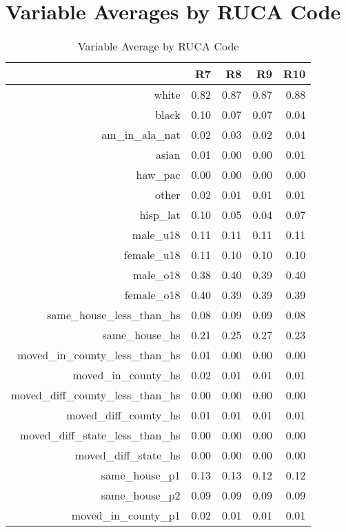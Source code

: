 \chapter{Variable Averages by RUCA Code}	%

\begin{table}[ht]
    \caption{Variable Average by RUCA Code}
    \label{tab:ruca_stats}
    \tiny
    \centering
    \begin{tabular}{rrrrr}
      \hline
     & R7 & R8 & R9 & R10 \\ 
      \hline
    white & 0.82 & 0.87 & 0.87 & 0.88 \\ 
      black & 0.10 & 0.07 & 0.07 & 0.04 \\ 
      am\_in\_ala\_nat & 0.02 & 0.03 & 0.02 & 0.04 \\ 
      asian & 0.01 & 0.00 & 0.00 & 0.01 \\ 
      haw\_pac & 0.00 & 0.00 & 0.00 & 0.00 \\ 
      other & 0.02 & 0.01 & 0.01 & 0.01 \\ 
      hisp\_lat & 0.10 & 0.05 & 0.04 & 0.07 \\ 
      male\_u18 & 0.11 & 0.11 & 0.11 & 0.11 \\ 
      female\_u18 & 0.11 & 0.10 & 0.10 & 0.10 \\ 
      male\_o18 & 0.38 & 0.40 & 0.39 & 0.40 \\ 
      female\_o18 & 0.40 & 0.39 & 0.39 & 0.39 \\ 
      same\_house\_less\_than\_hs & 0.08 & 0.09 & 0.09 & 0.08 \\ 
      same\_house\_hs & 0.21 & 0.25 & 0.27 & 0.23 \\ 
      moved\_in\_county\_less\_than\_hs & 0.01 & 0.00 & 0.00 & 0.00 \\ 
      moved\_in\_county\_hs & 0.02 & 0.01 & 0.01 & 0.01 \\ 
      moved\_diff\_county\_less\_than\_hs & 0.00 & 0.00 & 0.00 & 0.00 \\ 
      moved\_diff\_county\_hs & 0.01 & 0.01 & 0.01 & 0.01 \\ 
      moved\_diff\_state\_less\_than\_hs & 0.00 & 0.00 & 0.00 & 0.00 \\ 
      moved\_diff\_state\_hs & 0.00 & 0.00 & 0.00 & 0.00 \\ 
      same\_house\_p1 & 0.13 & 0.13 & 0.12 & 0.12 \\ 
      same\_house\_p2 & 0.09 & 0.09 & 0.09 & 0.09 \\ 
      moved\_in\_county\_p1 & 0.02 & 0.01 & 0.01 & 0.01 \\ 

\end{tabular}
\end{table}

